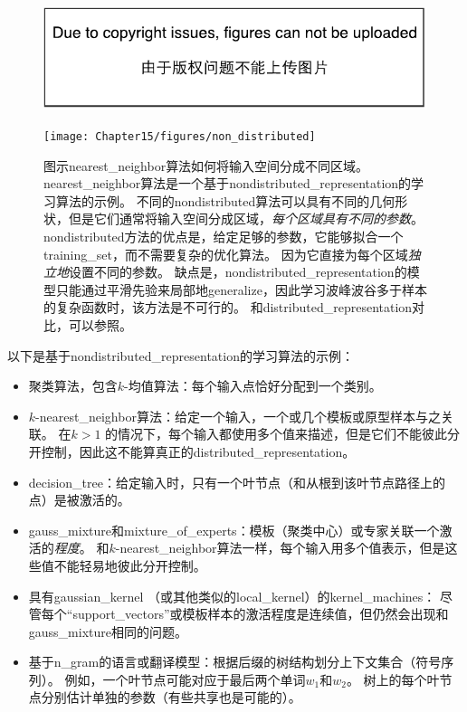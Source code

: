 \begin{figure}[!htb]
\ifOpenSource
\centerline{\includegraphics{figure.pdf}}
\else
\centerline{\texttt{[image: Chapter15/figures/non\_distributed]}}
\fi
\caption{图示\gls{nearest_neighbor}算法如何将输入空间分成不同区域。
\gls{nearest_neighbor}算法是一个基于\gls{nondistributed_representation}的学习算法的示例。
不同的\gls{nondistributed}算法可以具有不同的几何形状，但是它们通常将输入空间分成区域，\emph{每个区域具有不同的参数}。
\gls{nondistributed}方法的优点是，给定足够的参数，它能够拟合一个\gls{training_set}，而不需要复杂的优化算法。
因为它直接为每个区域\emph{独立地}设置不同的参数。
缺点是，\gls{nondistributed_representation}的模型只能通过平滑先验来局部地\gls{generalize}，因此学习波峰波谷多于样本的复杂函数时，该方法是不可行的。
和\gls{distributed_representation}对比，可以参照。
}
\label{fig:chap15_nondistributed}
\end{figure}




以下是基于\gls{nondistributed_representation}的学习算法的示例：
\begin{itemize}
	\item 聚类算法，包含$k$-均值算法：每个输入点恰好分配到一个类别。

	\item $k$-\gls{nearest_neighbor}算法：给定一个输入，一个或几个模板或原型样本与之关联。
	在$k >  1$ 的情况下，每个输入都使用多个值来描述，但是它们不能彼此分开控制，因此这不能算真正的\gls{distributed_representation}。

	\item \gls{decision_tree}：给定输入时，只有一个叶节点（和从根到该叶节点路径上的点）是被激活的。

	\item \gls{gauss_mixture}和\gls{mixture_of_experts}：模板（聚类中心）或专家关联一个激活的\emph{程度}。
	和$k$-\gls{nearest_neighbor}算法一样，每个输入用多个值表示，但是这些值不能轻易地彼此分开控制。

	\item 具有\gls{gaussian_kernel} （或其他类似的\gls{local_kernel}）的\gls{kernel_machines}： 尽管每个``\gls{support_vectors}''或模板样本的激活程度是连续值，但仍然会出现和\gls{gauss_mixture}相同的问题。


	\item 基于\gls{n_gram}的语言或翻译模型：根据后缀的树结构划分上下文集合（符号序列）。
	例如，一个叶节点可能对应于最后两个单词$w_1$和$w_2$。
	树上的每个叶节点分别估计单独的参数（有些共享也是可能的）。
\end{itemize}

